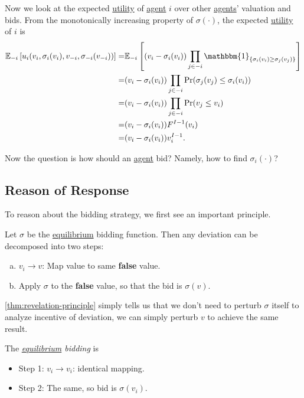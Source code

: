 Now we look at the expected \hyperref[def:reward]{utility}  of \hyperref[def:player]{agent} \(i\) over other \hyperref[def:player]{agents}' valuation and bids. From the monotonically increasing property of \(\sigma(\cdot)\), the expected \hyperref[def:reward]{utility}  of \(i\) is
\[
	\begin{split}
		\mathbb{E}_{-i}\left[u_{i}(v_{i}, \sigma_{i}(v_{i}), v_{-i}, \sigma_{-i}(v_{-i})) \right]
		= &\mathbb{E}_{-i}\left[(v_{i} - \sigma_{i}(v_{i})) \prod\limits_{j\in -i}\mathbbm{1}_{\{ \sigma_{i}(v_{i})\geq \sigma_{j}(v_{j}) \}} \right]\\
		= &(v_{i} - \sigma_{i}(v_{i}))\prod\limits_{j\in -i}\Pr(\sigma_{j}(v_{j})\leq \sigma_{i}(v_{i}))\\
		= &(v_{i} - \sigma_{i}(v_{i}))\prod\limits_{j\in -i}\Pr(v_{j}\leq v_{i})\\
		= &(v_{i} - \sigma_{i}(v_{i}))F^{I-1}(v_{i})\\
		= &(v_{i} - \sigma_{i}(v_{i}))v_{i}^{I-1}.
	\end{split}
\]

Now the question is how should an \hyperref[def:player]{agent} bid? Namely, how to find \(\sigma_{i}(\cdot)\)?
\subsection{Reason of Response}
To reason about the bidding strategy, we first see an important principle.
\begin{theorem}\label{thm:revelation-principle}
	Let \(\sigma\) be the \hyperref[def:Nash-equilibrium]{equilibrium} bidding function. Then any deviation can be decomposed into two steps:
	\begin{enumerate}[(a)]
		\item \(v_{i}\to v\): Map value to same \textbf{false} value.
		\item Apply \(\sigma\) to the \textbf{false} value, so that the bid is \(\sigma(v)\).
	\end{enumerate}
\end{theorem}

\begin{intuition}
	\autoref{thm:revelation-principle} simply tells us that we don't need to perturb \(\sigma\) itself to analyze incentive of deviation, we can simply perturb \(v\) to achieve the same result.
\end{intuition}

\begin{remark}\label{rmk:equilibrium-bidding}
	The \emph{\hyperref[def:Nash-equilibrium]{equilibrium} bidding} is
	\begin{itemize}
		\item Step 1: \(v_{i}\to v_{i}\): identical mapping.
		\item Step 2: The same, so bid is \(\sigma(v_{i})\).
	\end{itemize}
\end{remark}

